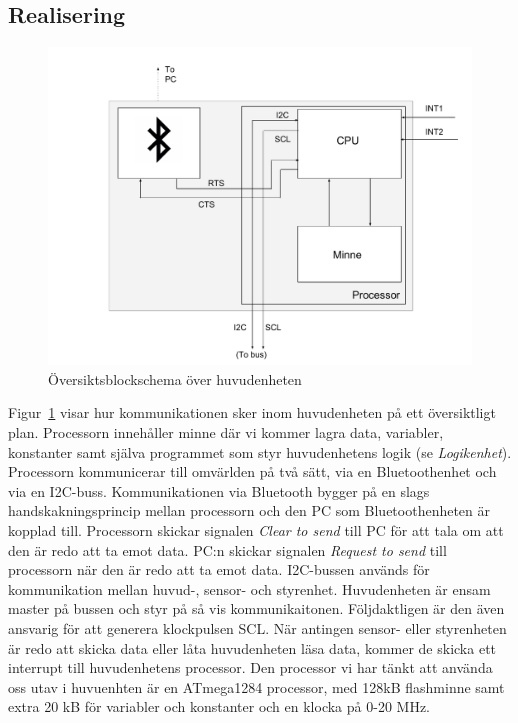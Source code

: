 \documentclass{article}
\begin{document}
\subsection{Realisering}

\begin{figure}[H]
\centering
\includegraphics[scale=0.25]{Huvudmodul_oversikt_blockschema}
\caption{Översiktsblockschema över huvudenheten}
\label{fig:huvudmodul}
\end{figure}

Figur~\ref{fig:huvudmodul} visar hur kommunikationen sker inom huvudenheten på ett översiktligt plan. Processorn innehåller minne där vi kommer lagra data, variabler, konstanter samt själva programmet som styr huvudenhetens logik (se \textit{Logikenhet}). Processorn kommunicerar till omvärlden på två sätt, via en Bluetoothenhet och via en I2C-buss. Kommunikationen via Bluetooth bygger på en slags handskakningsprincip mellan processorn och den PC som Bluetoothenheten är kopplad till. Processorn skickar signalen \textit{Clear to send} till PC för att tala om att den är redo att ta emot data. PC:n skickar signalen \textit{Request to send} till processorn när den är redo att ta emot data. I2C-bussen används för kommunikation mellan huvud-, sensor- och styrenhet. Huvudenheten är ensam master på bussen och styr på så vis kommunikaitonen. Följdaktligen är den även ansvarig för att generera klockpulsen SCL. När antingen sensor- eller styrenheten är redo att skicka data eller låta huvudenheten läsa data, kommer de skicka ett interrupt till huvudenhetens processor. Den processor vi har tänkt att använda oss utav i huvuenhten är en ATmega1284 processor, med 128kB flashminne samt extra 20 kB för variabler och konstanter och en klocka på 0-20 MHz.
 
\end{document}
